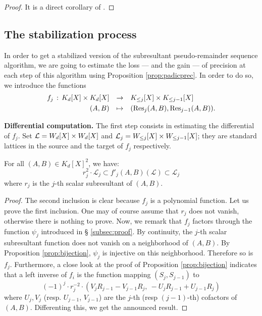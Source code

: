 \documentclass{sig-alternate}
\begin{document}
\begin{proof}
It is a direct corollary of \cite[Proposition 3.12]{}.
\end{proof}

\subsection{The stabilization process}

In order to get a stabilized version of the subresultant 
pseudo-remainder sequence algorithm, we are going to estimate 
the loss --- and the gain --- of precision at each step of this 
algorithm using Proposition \ref{prop:padicprec}. In order to do
so, we introduce the functions
$$\begin{array}{rcl}
f_j \, : \, K_d[X] \times K_d[X] & \to & K_{\leq j}[X] \times 
K_{\leq j-1}[X] \smallskip \\
(A,B) & \mapsto & (\Res_j(A,B), \Res_{j-1}(A,B)).
\end{array}$$

\noindent
{\bf Differential computation.}
The first step consists in estimating the differential of $f_j$. 
Set $\mathcal L = W_d[X] \times W_d[X]$ and $\mathcal L_j = 
W_{\leq j}[X] \times W_{\leq j-1}[X]$; they are standard lattices
in the source and the target of $f_j$ respectively.

\begin{lem}
\label{lem:diff}
For all $(A,B) \in K_d[X]^2$, we have:
$$r_j^2 \cdot \mathcal L_j 
\subset f'_j(A,B)(\mathcal L) \subset \mathcal L_j$$
where $r_j$ is the $j$-th scalar subresultant of $(A,B)$.
\end{lem}

\begin{proof}
The second inclusion is clear because $f_j$ is a polynomial function. 
Let us prove the first inclusion. One may of course assume that $r_j$ 
does not vanish, otherwise there is nothing to prove. Now, we remark 
that $f_j$ factors through the function $\psi_j$ introduced in \S 
\ref{subsec:proof}. By continuity, the $j$-th scalar subresultant 
function does not vanish on a neighborhood of $(A,B)$. By Proposition 
\ref{prop:bijection}, $\psi_j$ is injective on this neighborhood. 
Therefore so is $f_j$. Furthermore, a close look at the proof of 
Proposition \ref{prop:bijection} indicates that a left inverse of $f_i$ 
is the function mapping $(S_j, S_{j-1})$ to
$$(-1)^j \cdot r_j^{-2} \cdot 
(V_j R_{j-1}{-}V_{j-1} R_j,\: -U_j R_{j-1}{+}U_{j-1} R_j)$$
where $U_j, V_j$ (resp. $U_{j-1}$, $V_{j-1}$) are the $j$-th (resp 
$(j-1)$-th) cofactors of $(A,B)$. Differenting this, we get the
announced result.
\end{proof}
\end{document}
